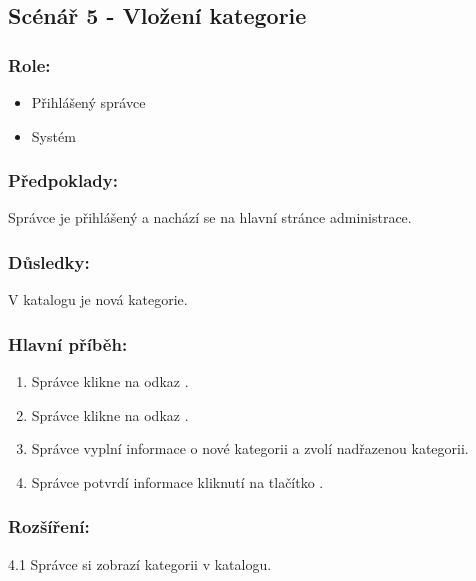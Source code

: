 \documentclass[11pt,twoside,a4paper]{book}
\begin{document}
\subsection{Scénář 5 - Vložení kategorie}

\subsubsection*{Role:}

\begin{itemize}
\item Přihlášený správce
\item Systém
\end{itemize}

\subsubsection*{Předpoklady:}

Správce je přihlášený a nachází se na hlavní stránce administrace.

\subsubsection*{Důsledky:}

V katalogu je nová kategorie.

\subsubsection*{Hlavní příběh:}

\begin{enumerate}
\item Správce klikne na odkaz .
\item Správce klikne na odkaz .
\item Správce vyplní informace o nové kategorii a zvolí nadřazenou kategorii.
\item Správce potvrdí informace kliknutí na tlačítko .
\end{enumerate}

\subsubsection*{Rozšíření:}

\begin{description}
\item  4.1 Správce si zobrazí kategorii v katalogu.
\end{description}
\end{document}
